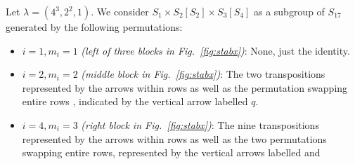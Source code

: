 \documentclass[ALCO, Unicode]{cedram}
\renewcommand{\arraystretch}{1.25}
\begin{document}
\begin{exam}\label{ex:wreath-prod} Let $\lambda = (4^3, 2^2, 1).$ We consider $S_1 \times S_2[S_2] \times S_3[S_4]$ as a subgroup of $S_{17}$ generated by the following permutations:
\begin{itemize}
    \item $i = 1, m_i = 1$ \textit{(left of three blocks in  Fig.~\ref{fig:stabx})}: None, just the identity.
    \item $i = 2, m_i = 2$ \textit{(middle block in Fig.~\ref{fig:stabx})}: The two transpositions represented by the arrows within rows  \color{red}{$(2, 3)$, $(4, 5)$} \normalcolor as well as the permutation swapping entire rows \color{blue}{$q = (2, 4)(3, 5)$}\normalcolor, indicated by the vertical arrow labelled $q$. 
    \item $i = 4, m_i = 3$ \textit{(right block in Fig.~\ref{fig:stabx})}:  The nine transpositions represented by the arrows within rows \color{red}{$(6, 7)$, $(7, 8)$, $(8, 9)$, $(10, 11)$, $(11, 12)$, $(12, 13)$, $(14, 15)$, $(15, 16)$, $(16, 17),$} \normalcolor as well as  the two permutations swapping entire rows, represented by the vertical arrows labelled \color{blue}{$r_1 = (6,10)(7,11)(8,12)(9,13)$} \normalcolor and \color{blue}{$r_2 = (10, 14)(11, 15)(12,16)(13,17).$}
\end{itemize}


    \begin{figure} 
        \begin{center}
    \renewcommand{\arraystretch}{2}


\end{center}
\end{figure}
\end{exam}
\end{document}
